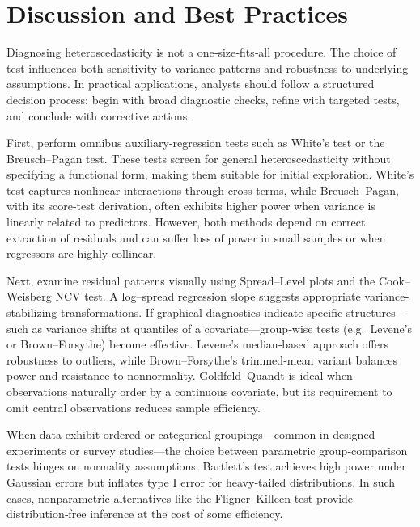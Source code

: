 \section{Discussion and Best Practices}\label{sec:discussion}
Diagnosing heteroscedasticity is not a one‐size‐fits‐all procedure. The choice of test influences both sensitivity to variance patterns and robustness to underlying assumptions. In practical applications, analysts should follow a structured decision process: begin with broad diagnostic checks, refine with targeted tests, and conclude with corrective actions.

First, perform omnibus auxiliary‐regression tests such as White’s test or the Breusch–Pagan test. These tests screen for general heteroscedasticity without specifying a functional form, making them suitable for initial exploration. White’s test captures nonlinear interactions through cross‐terms, while Breusch–Pagan, with its score‐test derivation, often exhibits higher power when variance is linearly related to predictors. However, both methods depend on correct extraction of residuals and can suffer loss of power in small samples or when regressors are highly collinear.

Next, examine residual patterns visually using Spread–Level plots and the Cook–Weisberg NCV test. A log–spread regression slope suggests appropriate variance‐stabilizing transformations. If graphical diagnostics indicate specific structures—such as variance shifts at quantiles of a covariate—group‐wise tests (e.g.\ Levene’s or Brown–Forsythe) become effective. Levene’s median‐based approach offers robustness to outliers, while Brown–Forsythe’s trimmed‐mean variant balances power and resistance to nonnormality. Goldfeld–Quandt is ideal when observations naturally order by a continuous covariate, but its requirement to omit central observations reduces sample efficiency.

When data exhibit ordered or categorical groupings—common in designed experiments or survey studies—the choice between parametric group‐comparison tests hinges on normality assumptions. Bartlett’s test achieves high power under Gaussian errors but inflates type I error for heavy‐tailed distributions. In such cases, nonparametric alternatives like the Fligner–Killeen test provide distribution‐free inference at the cost of some efficiency.

